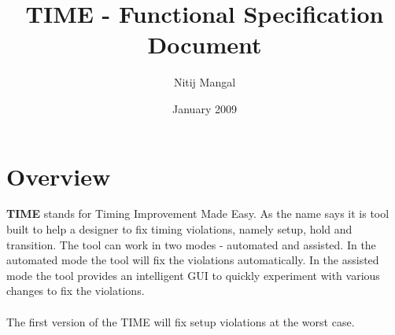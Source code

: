 \documentclass[11pt]{article}
\begin{document}
\title{TIME - Functional Specification Document}
\author{Nitij Mangal}
\date{January 2009}
\maketitle

\section{Overview}
\textbf{TIME} stands for Timing Improvement Made Easy. As the name says it is tool built to help a designer to fix timing violations, namely setup, hold and transition. The tool can work in two modes - automated and assisted. In the automated mode the tool will fix the violations automatically. In the assisted mode the tool provides an intelligent GUI to quickly experiment with various changes to fix the violations. \\ \\

The first version of the TIME will fix setup violations at the worst case.
\end{document}
